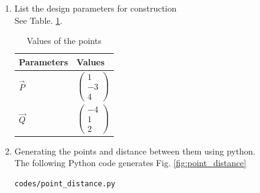 \renewcommand{\theequation}{\theenumi}
\begin{enumerate}[label=\thesection.\arabic*.,ref=\thesection.\theenumi]


%
%
%
\item List the design parameters for construction
\label{const:table1}
\\
\solution See Table. \ref{table:table1}. 
%
\begin{table}[ht!]
\centering
\begin{tabular}{ |p{3cm}|p{3cm}|  }
\hline
Parameters & Values \\
\hline
$\vec{P} $ & $$\begin{pmatrix}1\\-3\\4\end{pmatrix} $$\\
\hline
$\vec{Q}$ & $$\begin{pmatrix}-4\\1\\2\end{pmatrix}  $$\\
\hline

\end{tabular}
%
\caption{Values of the points}
\label{table:table1}	
\end{table}

\item Generating the points and distance between them using python.\\
\solution The  following Python code generates Fig. \ref{fig:point_distance}
\begin{lstlisting}
codes/point_distance.py
\end{lstlisting}


\end{enumerate}
